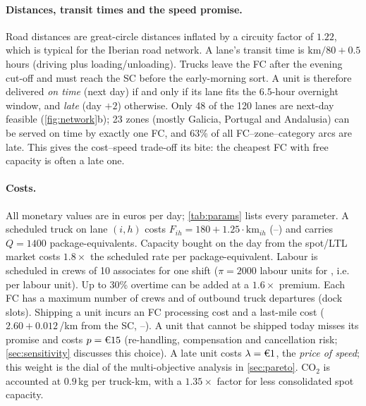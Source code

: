 \paragraph{Distances, transit times and the speed promise.}
Road distances are great-circle distances inflated by a circuity factor of $1.22$, which is typical for the Iberian road network.
A lane's transit time is $\text{km}/80 + 0.5$ hours (driving plus loading/unloading).
Trucks leave the FC after the evening cut-off and must reach the SC before the early-morning sort.
A unit is therefore delivered \emph{on time} (next day) if and only if its lane fits the $6.5$-hour overnight window, and \emph{late} (day $+2$) otherwise.
Only 48 of the 120 lanes are next-day feasible (\cref{fig:network}b); 23 zones (mostly Galicia, Portugal and Andalusia) can be served on time by exactly one FC, and 63\% of all FC--zone--category arcs are late.
This gives the cost--speed trade-off its bite: the cheapest FC with free capacity is often a late one.

\paragraph{Costs.} All monetary values are in euros per day; \cref{tab:params} lists every parameter.
A scheduled truck on lane $(i,h)$ costs $F_{ih} = 180 + 1.25\cdot\text{km}_{ih}$ (--) and carries $Q=1400$ package-equivalents.
Capacity bought on the day from the spot/LTL market costs $1.8\times$ the scheduled rate per package-equivalent.
Labour is scheduled in crews of 10 associates for one shift ($\pi = 2000$ labour units for , i.e.\  per labour unit).
Up to 30\% overtime can be added at a $1.6\times$ premium.
Each FC has a maximum number of crews and of outbound truck departures (dock slots).
Shipping a unit incurs an FC processing cost and a last-mile cost ($2.60 + 0.012$\,\EUR{}/km from the SC, --).
A unit that cannot be shipped today misses its promise and costs $p = \EUR{15}$ (re-handling, compensation and cancellation risk; \cref{sec:sensitivity} discusses this choice).
A late unit costs $\lambda = \EUR{1}$, the \emph{price of speed}; this weight is the dial of the multi-objective analysis in \cref{sec:pareto}.
CO$_2$ is accounted at $0.9$\,kg per truck-km, with a $1.35\times$ factor for less consolidated spot capacity.



